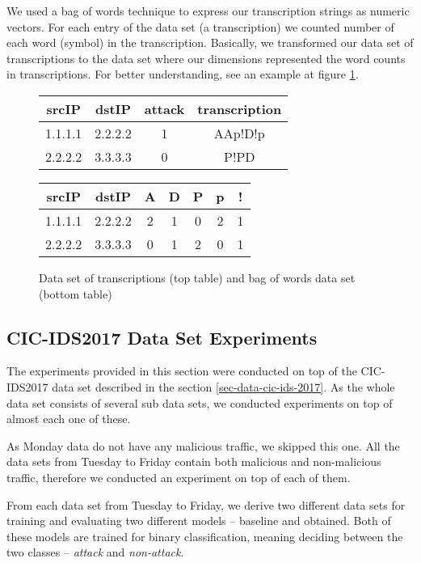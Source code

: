 \documentclass{article}
\begin{document}
We used a bag of words technique to express our transcription strings as numeric vectors. For each entry of the data set (a transcription) we counted number of each word (symbol) in the transcription. Basically, we transformed our data set of transcriptions to the data set where our dimensions represented the word counts in transcriptions. For better understanding, see an example at figure \ref{fig-bag-of-words-example}.

\begin{figure}[h!]
\centering
\begin{tabular}{ |c|c|c|c| }
 \hline
 srcIP & dstIP & attack & transcription \\
 \hline
 1.1.1.1 & 2.2.2.2 & 1 & AAp!D!p \\
 2.2.2.2 & 3.3.3.3 & 0 & P!PD \\
 \hline
\end{tabular}

\vspace{0.3cm}

\begin{tabular}{ |c|c|c|c|c|c|c| }
 \hline
 srcIP & dstIP & A & D & P & p & ! \\
 \hline
 1.1.1.1 & 2.2.2.2 & 2 & 1 & 0 & 2 & 1 \\
 2.2.2.2 & 3.3.3.3 & 0 & 1 & 2 & 0 & 1 \\
 \hline
\end{tabular}
\caption{Data set of transcriptions (top table) and bag of words data set (bottom table)}
\label{fig-bag-of-words-example}
\end{figure}


\subsection{CIC-IDS2017 Data Set Experiments}\label{sec-cic-ids-experiments}

The experiments provided in this section were conducted on top of the CIC-IDS2017 data set described in the section \ref{sec-data-cic-ids-2017}. As the whole data set consists of several sub data sets, we conducted experiments on top of almost each one of these.

As Monday data do not have any malicious traffic, we skipped this one. All the data sets from Tuesday to Friday contain both malicious and non-malicious traffic, therefore we conducted an experiment on top of each of them.

From each data set from Tuesday to Friday, we derive two different data sets for training and evaluating two different models -- baseline and obtained. Both of these models are trained for binary classification, meaning deciding between the two classes -- \textit{attack} and \textit{non-attack}.
\end{document}
